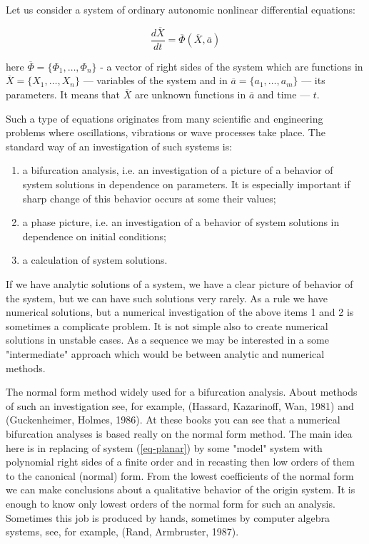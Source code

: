 Let us consider a system of ordinary autonomic nonlinear
differential equations:

\begin{equation}
\label{eq-planar}
\frac{d \overline{X}}{dt} = \overline{\Phi}(\overline{X},
\overline{a})
\end{equation}

\noindent
here $\overline{\Phi} = \{\Phi_1, \ldots, \Phi_n\}$ - a vector of right 
sides of the system which are functions in $\overline{X} = \{X_1, 
\ldots, X_n\}$ --- variables of the system and in $\overline{a} = 
\{a_1, \ldots, a_m\}$ --- its parameters. It means that $\overline{X}$  
are unknown functions in $\overline{a}$ and time --- $t$.

Such a type of equations originates from many scientific and engineering
problems where oscillations, vibrations or wave processes take place.
The standard way of an investigation of such systems is:

\begin{enumerate}

\item
a bifurcation analysis, i.e. an investigation of a picture of a behavior
of system 
solutions in dependence on parameters. It is especially important
if sharp change of this behavior occurs at some their values;

\item
a phase picture, i.e. an investigation of a behavior of system 
solutions in dependence on initial conditions;

\item
a calculation of system solutions. 

\end{enumerate}

If we have analytic solutions of a system, we have a clear picture of
behavior of the system, but we can have such solutions very rarely.
As a rule we have numerical solutions, but a numerical investigation 
of the above items 1 and 2  is sometimes a complicate problem. It is not 
simple also to create numerical solutions in unstable cases. As a 
sequence we may be interested in a some "intermediate" approach which 
would be between analytic and numerical methods.

The normal form method widely used for a bifurcation analysis. About 
methods of such an investigation see, for example, (Hassard, Kazarinoff, 
Wan, 1981) and (Guckenheimer, Holmes, 1986).
At these books you can see that a numerical bifurcation analyses is 
based really on the normal form method. The main idea here is in
replacing of system (\ref{eq-planar}) by some "model" system with
polynomial right sides of a finite order and in recasting then low 
orders of them to the canonical (normal) form. From the lowest 
coefficients of the normal form we can make conclusions 
about a qualitative behavior of the origin system. It is enough to
know only lowest orders of the normal form for such an analysis. 
Sometimes this job is produced by hands, sometimes by computer algebra 
systems, see, for example, (Rand, Armbruster, 1987).


